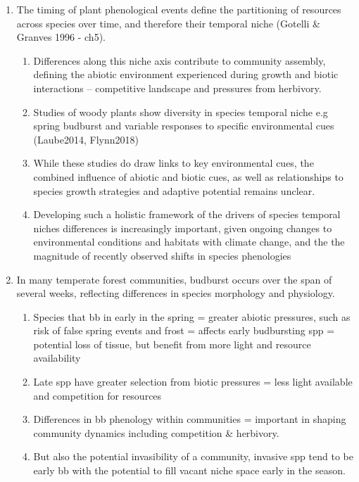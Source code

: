 \documentclass{article}
\begin{document}
\begin{enumerate}
\item The timing of plant phenological events define the partitioning of resources across species over time, and therefore their temporal niche (Gotelli \& Granves 1996 - ch5).
\begin{enumerate}
\item Differences along this niche axis contribute to community assembly, defining the abiotic environment experienced during growth and biotic interactions -- competitive landscape and pressures from herbivory.
\item Studies of woody plants show diversity in species temporal niche e.g spring budburst and variable responses to specific environmental cues (Laube2014, Flynn2018)
\item While these studies do draw links to key environmental cues, the combined influence of abiotic and biotic cues, as well as relationships to species growth strategies and adaptive potential remains unclear.
\item Developing such a holistic framework of the drivers of species temporal niches differences is increasingly important, given ongoing changes to environmental conditions and habitats with climate change, and the the magnitude of recently observed shifts in species phenologies
\end{enumerate}


\item In many temperate forest communities, budburst occurs over the span of several weeks, reflecting differences in species morphology and physiology.
\begin{enumerate}
\item Species that bb in early in the spring = greater abiotic pressures, such as risk of false spring events and frost = affects early budbursting spp = potential loss of tissue, but benefit from more light and resource availability
\item Late spp have greater selection from biotic pressures = less light available and competition for resources 
\item Differences in bb phenology within communities = important in shaping community dynamics including competition \& herbivory. 
\item But also the potential invasibility of a community, invasive spp tend to be early bb with the potential to fill vacant niche space early in the season. 
\end{enumerate}


\end{enumerate}
\end{document}

